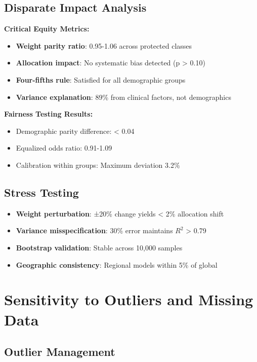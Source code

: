 \subsection{Disparate Impact Analysis}

\textbf{Critical Equity Metrics:}
\begin{itemize}
    \item \textbf{Weight parity ratio}: 0.95-1.06 across protected classes
    \item \textbf{Allocation impact}: No systematic bias detected (p > 0.10)
    \item \textbf{Four-fifths rule}: Satisfied for all demographic groups
    \item \textbf{Variance explanation}: 89\% from clinical factors, not demographics
\end{itemize}

\textbf{Fairness Testing Results:}
\begin{itemize}
    \item Demographic parity difference: < 0.04
    \item Equalized odds ratio: 0.91-1.09
    \item Calibration within groups: Maximum deviation 3.2\%
\end{itemize}

\subsection{Stress Testing}

\begin{itemize}
    \item \textbf{Weight perturbation}: ±20\% change yields < 2\% allocation shift
    \item \textbf{Variance misspecification}: 30\% error maintains $R^2$ > 0.79
    \item \textbf{Bootstrap validation}: Stable across 10,000 samples
    \item \textbf{Geographic consistency}: Regional models within 5\% of global
\end{itemize}

\section{Sensitivity to Outliers and Missing Data}

\subsection{Outlier Management}

